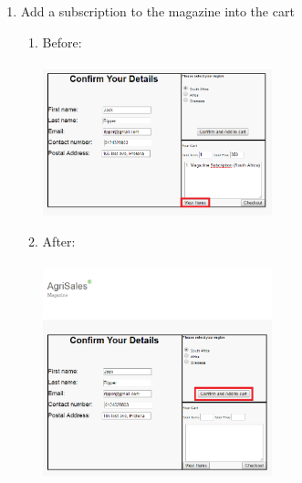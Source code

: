 \documentclass[11pt]{article}
\begin{document}
\begin{enumerate}
\newpage
	
		\item Add a subscription to the magazine into the cart
			\begin{enumerate}
				\item Before: \\ \\
					\includegraphics[width=0.55\textwidth]{../Images/Tasks/viewItems.png}
				\item After: \\ \\
					\includegraphics[width=0.55\textwidth]{../Images/Tasks/Subscribe.png}
			\end{enumerate}
		
\newpage


\end{enumerate}
\end{document}
